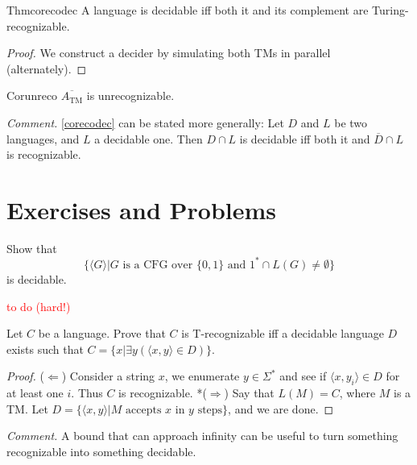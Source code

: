 \begin{reference}{Thm}{corecodec}
  A language is decidable iff both it and its complement are Turing-recognizable.
\end{reference}

\begin{proof}
  We construct a decider by simulating both TMs in parallel (alternately).
\end{proof}

\begin{reference}{Cor}{unreco}
  $\overline{A_{\mathrm{TM}}}$ is unrecognizable.
\end{reference}

\textit{Comment.} \ref{corecodec} can be stated more generally: Let $D$ and $L$ be two languages, and $L$ a decidable one. Then $D\cap L$ is decidable iff both it and $\overline{D}\cap L$ is recognizable.

\section*{Exercises and Problems}

\setcounter{exercise}{13}

\begin{exercise}
  Show that
  \[
    \{\langle G\rangle|G\text{ is a CFG over }\{0,1\}\text{ and }1^*\cap L(G)\neq\emptyset\}
  \]
  is decidable.
\end{exercise}

\textcolor{red}{to do (hard!)}

\setcounter{exercise}{17}

\begin{exercise}
  Let $C$ be a language. Prove that $C$ is T-recognizable iff a decidable language $D$ exists such that $C=\{x|\exists y(\langle x,y\rangle\in D)\}$.
\end{exercise}

\begin{proof}
  ($\Leftarrow$) Consider a string $x$, we enumerate $y\in \Sigma^*$ and see if $\langle x,y_i\rangle\in D$ for at least one $i$. Thus $C$ is recognizable. *($\Rightarrow$) Say that $L(M)=C$, where $M$ is a TM. Let $D=\{\langle x,y\rangle|M\text{ accepts }x\text{ in }y\text{ steps}\}$, and we are done.
\end{proof}

\textit{Comment.} A bound that can approach infinity can be useful to turn something recognizable into something decidable.

\setcounter{exercise}{23}

